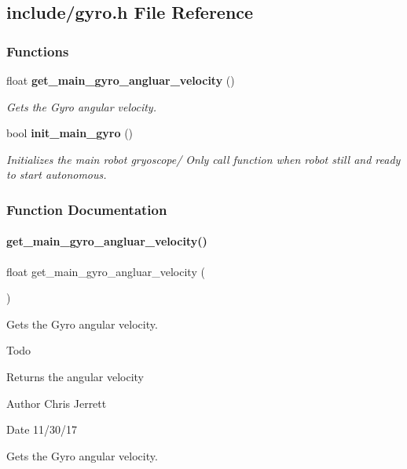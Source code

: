 \subsection{include/gyro.h File Reference}
\label{gyro_8h}
\subsubsection*{Functions}
\begin{DoxyCompactItemize}
\item 
float \textbf{ get\+\_\+main\+\_\+gyro\+\_\+angluar\+\_\+velocity} ()
\begin{DoxyCompactList}\small\item\em Gets the Gyro angular velocity. \end{DoxyCompactList}\item 
bool \textbf{ init\+\_\+main\+\_\+gyro} ()
\begin{DoxyCompactList}\small\item\em Initializes the main robot gryoscope/ Only call function when robot still and ready to start autonomous. \end{DoxyCompactList}\end{DoxyCompactItemize}


\subsubsection{Function Documentation}
\mbox{\label{gyro_8h_aec0963ebe3eb6cdfd7edaf486bbb0a87}} 
\paragraph{get\+\_\+main\+\_\+gyro\+\_\+angluar\+\_\+velocity()}
{\footnotesize\ttfamily float get\+\_\+main\+\_\+gyro\+\_\+angluar\+\_\+velocity (\begin{DoxyParamCaption}{ }\end{DoxyParamCaption})}



Gets the Gyro angular velocity. 

\begin{DoxyRefDesc}{Todo}
\item[\textbf{ Todo}]\end{DoxyRefDesc}
\begin{DoxyReturn}{Returns}
the angular velocity 
\end{DoxyReturn}
\begin{DoxyAuthor}{Author}
Chris Jerrett 
\end{DoxyAuthor}
\begin{DoxyDate}{Date}
11/30/17
\end{DoxyDate}
Gets the Gyro angular velocity.

